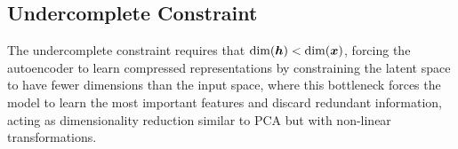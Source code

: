 \subsection{Undercomplete Constraint}

The undercomplete constraint requires that $\dim(\boldsymbol{h}) < \dim(\boldsymbol{x})$, forcing the autoencoder to learn compressed representations by constraining the latent space to have fewer dimensions than the input space, where this bottleneck forces the model to learn the most important features and discard redundant information, acting as dimensionality reduction similar to PCA but with non-linear transformations.





